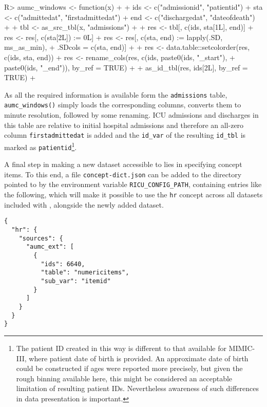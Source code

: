 \documentclass[
  notitle,
  nojss,
  noheadings]{jss}
\begin{document}
\begin{CodeChunk}
\begin{CodeInput}
R> aumc_windows <- function(x) {
+ 
+   ids <- c("admissionid", "patientid")
+   sta <- c("admittedat", "firstadmittedat")
+   end <- c("dischargedat", "dateofdeath")
+ 
+   tbl <- as_src_tbl(x, "admissions")
+ 
+   res <- tbl[, c(ids, sta[1L], end)]
+   res <- res[, c(sta[2L]) := 0L]
+   res <- res[, c(sta, end) := lapply(.SD, ms_as_min),
+              .SDcols = c(sta, end)]
+ 
+   res <- data.table::setcolorder(res, c(ids, sta, end))
+   res <- rename_cols(res, c(ids, paste0(ids, "_start"),
+                                  paste0(ids, "_end")), by_ref = TRUE)
+ 
+   as_id_tbl(res, ids[2L], by_ref = TRUE)
+ }
\end{CodeInput}
\end{CodeChunk}

As all the required information is available form the
\texttt{admissions} table, \texttt{aumc\_windows()} simply loads the
corresponding columns, converts them to minute resolution, followed by
some renaming. ICU admissions and discharges in this table are relative
to initial hospital admissions and therefore an all-zero column
\texttt{firstadmittedat} is added and the \texttt{id\_var} of the
resulting \texttt{id\_tbl} is marked as \texttt{patientid}\footnote{The
  patient ID created in this way is different to that available for
  MIMIC-III, where patient date of birth is provided. An approximate
  date of birth could be constructed if ages were reported more
  precisely, but given the rough binning available here, this might be
  considered an acceptable limitation of resulting patient IDs.
  Nevertheless awareness of such differences in data presentation is
  important.}.

A final step in making a new dataset accessible to  lies in
specifying concept items. To this end, a file \texttt{concept-dict.json}
can be added to the directory pointed to by the environment variable
\texttt{RICU\_CONFIG\_PATH}, containing entries like the following,
which will make it possible to use the \texttt{hr} concept across all
datasets included with , alongside the newly added dataset.

\begin{verbatim}
{
  "hr": {
    "sources": {
      "aumc_ext": [
        {
          "ids": 6640,
          "table": "numericitems",
          "sub_var": "itemid"
        }
      ]
    }
  }
}
\end{verbatim}
\end{document}
